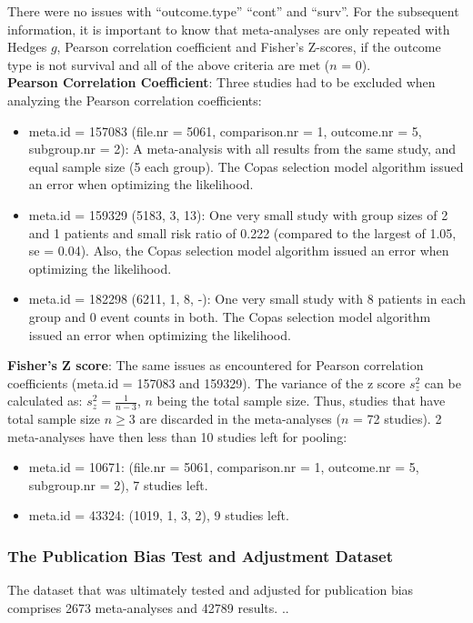 \documentclass[11pt,a4paper,twoside]{book}\usepackage[]{graphicx}\usepackage[]{color}
\begin{document}
There were no issues with ``outcome.type'' ``cont'' and ``surv''. For the subsequent information, it is important to know that meta-analyses are only repeated with Hedges $g$, Pearson correlation coefficient and Fisher's Z-scores, if the outcome type is not survival and all of the above criteria are met ($n$ = 0). \\
\textbf{Pearson Correlation Coefficient}: Three studies had to be excluded when analyzing the Pearson correlation coefficients:
\begin{itemize}
\item meta.id = 157083 (file.nr = 5061, comparison.nr = 1, outcome.nr = 5, subgroup.nr = 2): A meta-analysis with all results from the same study, and equal sample size (5 each group). The Copas selection model algorithm issued an error when optimizing the likelihood.
\item meta.id = 159329 (5183, 3, 13): One very small study with group sizes of 2 and 1 patients and small risk ratio of 0.222 (compared to the largest of 1.05, se = 0.04). Also, the Copas selection model algorithm issued an error when optimizing the likelihood.
\item meta.id = 182298 (6211, 1, 8, -): One very small study with 8 patients in each group and 0 event counts in both. The Copas selection model algorithm issued an error when optimizing the likelihood.
\end{itemize}

\textbf{Fisher's Z score}: The same issues as encountered for Pearson correlation coefficients (meta.id = 157083 and 159329). The variance of the z score $s_z^2$ can be calculated as:  $s_z^2 = \frac{1}{n-3}$, $n$ being the total sample size. Thus, studies that have total sample size $n \geq 3$ are discarded in the meta-analyses ($n$ = 72 studies). 2 meta-analyses have then less than 10 studies left for pooling: 
\begin{itemize}
\item meta.id = 10671: (file.nr = 5061, comparison.nr = 1, outcome.nr = 5, subgroup.nr = 2), 7 studies left.
\item meta.id = 43324: (1019, 1, 3, 2), 9 studies left.
\end{itemize}

\subsubsection{The Publication Bias Test and Adjustment Dataset}
The dataset that was ultimately tested and adjusted for publication bias comprises 2673 meta-analyses and 42789 results. ..
\end{document}

